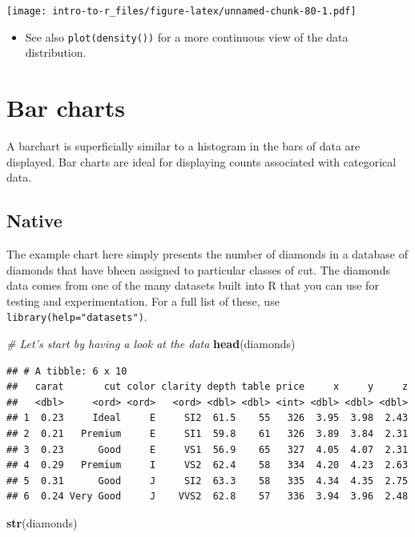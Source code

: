 \documentclass[a4paper]{book}
\newenvironment{Shaded}{\begin{snugshade}}{\end{snugshade}}
\newcommand{\KeywordTok}[1]{\textcolor[rgb]{0.13,0.29,0.53}{\textbf{{#1}}}}
\newcommand{\CommentTok}[1]{\textcolor[rgb]{0.56,0.35,0.01}{\textit{{#1}}}}
\newcommand{\NormalTok}[1]{{#1}}
\renewenvironment{Shaded}
{\vspace{1.5em}\begin{leftbar}\begin{snugshade}}
{\end{snugshade}\end{leftbar}\vspace{3pt}}
\newenvironment{rmdblock}[1]
  {\vspace{1.5em}\begin{shaded*}
  \begin{itemize}
  \renewcommand{\labelitemi}{
    \raisebox{-.7\height}[0pt][0pt]{
      {\setkeys{Gin}{width=3em,keepaspectratio}\texttt{[image: images/\#1]}}
    }
  }
  \item
  }
  {
  \end{itemize}
  \end{shaded*}
  }
\newenvironment{rmdtip}
  {\begin{rmdblock}{tip}}
  {\end{rmdblock}}
\begin{document}
\texttt{[image: intro-to-r\_files/figure-latex/unnamed-chunk-80-1.pdf]}

\begin{rmdtip}
See also \texttt{plot(density())} for a more continuous view of the data
distribution.
\end{rmdtip}

\section{Bar charts}\label{bar-charts}

A barchart is superficially similar to a histogram in the bars of data
are displayed. Bar charts are ideal for displaying counts associated
with categorical data.

\subsection{Native}\label{native-2}

The example chart here simply presents the number of diamonds in a
database of diamonds that have bheen assigned to particular classes of
cut. The diamonds data comes from one of the many datasets built into R
that you can use for testing and experimentation. For a full list of
these, use \texttt{library(help="datasets")}.

\begin{Shaded}
\begin{Highlighting}[]
\CommentTok{# Let's start by having a look at the data}
\KeywordTok{head}\NormalTok{(diamonds)}
\end{Highlighting}
\end{Shaded}

\begin{verbatim}
## # A tibble: 6 x 10
##   carat       cut color clarity depth table price     x     y     z
##   <dbl>     <ord> <ord>   <ord> <dbl> <dbl> <int> <dbl> <dbl> <dbl>
## 1  0.23     Ideal     E     SI2  61.5    55   326  3.95  3.98  2.43
## 2  0.21   Premium     E     SI1  59.8    61   326  3.89  3.84  2.31
## 3  0.23      Good     E     VS1  56.9    65   327  4.05  4.07  2.31
## 4  0.29   Premium     I     VS2  62.4    58   334  4.20  4.23  2.63
## 5  0.31      Good     J     SI2  63.3    58   335  4.34  4.35  2.75
## 6  0.24 Very Good     J    VVS2  62.8    57   336  3.94  3.96  2.48
\end{verbatim}

\begin{Shaded}
\begin{Highlighting}[]
\KeywordTok{str}\NormalTok{(diamonds)}
\end{Highlighting}
\end{Shaded}
\end{document}
